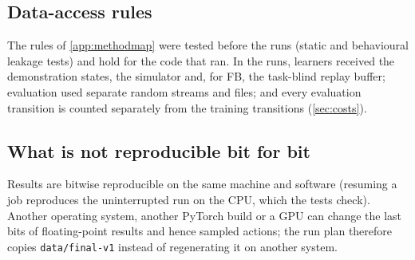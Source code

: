 \subsection{Data-access rules}

The rules of \cref{app:methodmap} were tested before the runs (static and behavioural leakage tests) and hold for the code that ran.
In the runs, learners received the demonstration states, the simulator and, for FB, the task-blind replay buffer; evaluation used separate random streams and files; and every evaluation transition is counted separately from the training transitions (\cref{sec:costs}).

\subsection{What is not reproducible bit for bit}

Results are bitwise reproducible on the same machine and software (resuming a job reproduces the uninterrupted run on the CPU, which the tests check).
Another operating system, another PyTorch build or a GPU can change the last bits of floating-point results and hence sampled actions; the run plan therefore copies \texttt{data/final-v1} instead of regenerating it on another system.
